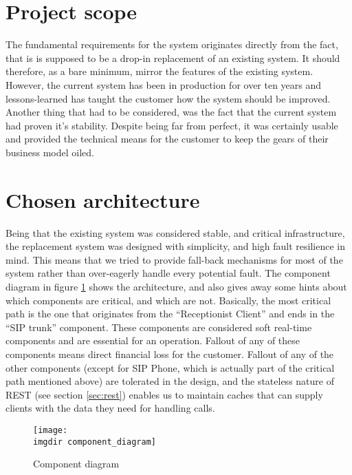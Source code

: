 \section{Project scope}
The fundamental requirements for the system originates directly from the fact, that is is supposed to be a drop-in replacement of an existing system. It should therefore, as a bare minimum, mirror the features of the existing system.\\
However, the current system has been in production for over ten years and lessons-learned has taught the customer how the system should be improved. Another thing that had to be considered, was the fact that the current system had proven it's stability. Despite being far from perfect, it was certainly usable and provided the technical means for the customer to keep the gears of their business model oiled.


\section{Chosen architecture}
Being that the existing system was considered stable, and critical infrastructure, the replacement system was designed with simplicity, and high fault resilience in mind. This means that we tried to provide fall-back mechanisms for most of the system rather than over-eagerly handle every potential fault. The component diagram in figure \ref{fig:component_diagramt} shows the architecture, and also gives away some hints about which components are critical, and which are not. Basically, the most critical path is the one that originates from the ``Receptionist Client'' and ends in the ``SIP trunk'' component. These components are considered soft real-time components and are essential for an operation. Fallout of any of these components means direct financial loss for the customer. Fallout of any of the other components (except for SIP Phone, which is actually part of the critical path mentioned above) are tolerated in the design, and the stateless nature of REST (see section \ref{sec:rest}) enables us to maintain caches that can supply clients with the data they need for handling calls.


\begin{figure}[ht]
\centering
\texttt{[image: \\imgdir component\_diagram]}
\caption{Component diagram}
\label{fig:component_diagramt}
\end{figure}

